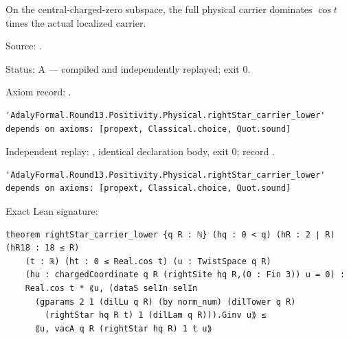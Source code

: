 \begin{theorem}[bp-495]
\label{bp-495}
\leanok
On the central-charged-zero subspace, the full physical carrier dominates \(\cos t\) times the actual localized carrier.

\par Source: \texttt{}.
\par Status: A — compiled and independently replayed; exit 0.
\par Axiom record: \texttt{}.
\begin{verbatim}
'AdalyFormal.Round13.Positivity.Physical.rightStar_carrier_lower' depends on axioms: [propext, Classical.choice, Quot.sound]
\end{verbatim}
\par Independent replay: \texttt{}, identical declaration body, exit 0; record \texttt{}.
\begin{verbatim}
'AdalyFormal.Round13.Positivity.Physical.rightStar_carrier_lower' depends on axioms: [propext, Classical.choice, Quot.sound]
\end{verbatim}
\par Exact Lean signature:
\begin{verbatim}
theorem rightStar_carrier_lower {q R : ℕ} (hq : 0 < q) (hR : 2 ∣ R) (hR18 : 18 ≤ R)
    (t : ℝ) (ht : 0 ≤ Real.cos t) (u : TwistSpace q R)
    (hu : chargedCoordinate q R (rightSite hq R,(0 : Fin 3)) u = 0) :
    Real.cos t * ⟪u, (dataS selIn selIn
      (gparams 2 1 (dilLu q R) (by norm_num) (dilTower q R)
        (rightStar hq R t) 1 (dilLam q R))).Ginv u⟫ ≤
      ⟪u, vacA q R (rightStar hq R) 1 t u⟫
\end{verbatim}
\end{theorem}

